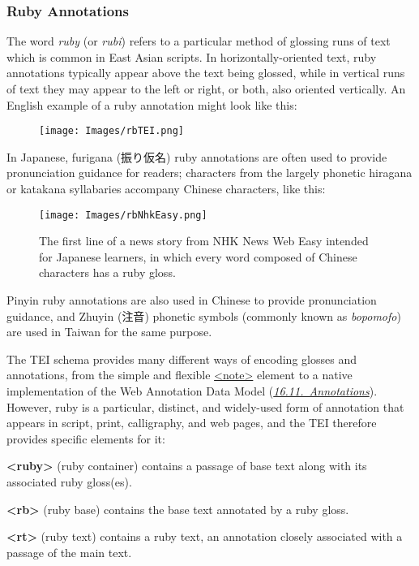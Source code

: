 \subsubsection[{Ruby Annotations}]{Ruby Annotations}\label{COHTGRB}\par
The word \textit{ruby} (or \textit{rubi}) refers to a particular method of glossing runs of text which is common in East Asian scripts. In horizontally-oriented text, ruby annotations typically appear above the text being glossed, while in vertical runs of text they may appear to the left or right, or both, also oriented vertically. An English example of a ruby annotation might look like this:\begin{figure}[htbp]
\noindent\noindent\texttt{[image: Images/rbTEI.png]}\end{figure}
\par
In Japanese, furigana ({\textJapanese 振り仮名}) ruby annotations are often used to provide pronunciation guidance for readers; characters from the largely phonetic hiragana or katakana syllabaries accompany Chinese characters, like this:\begin{figure}[htbp]
\noindent\noindent\texttt{[image: Images/rbNhkEasy.png]}
\caption{The first line of a news story from NHK News Web Easy intended for Japanese learners, in which every word composed of Chinese characters has a ruby gloss.}\end{figure}
\par
Pinyin ruby annotations are also used in Chinese to provide pronunciation guidance, and Zhuyin ({\textChinese 注音}) phonetic symbols (commonly known as \textit{bopomofo}) are used in Taiwan for the same purpose.\par
The TEI schema provides many different ways of encoding glosses and annotations, from the simple and flexible \hyperref[TEI.note]{<note>} element to a native implementation of the Web Annotation Data Model (\textit{\hyperref[SASOann]{16.11.\ Annotations}}). However, ruby is a particular, distinct, and widely-used form of annotation that appears in script, print, calligraphy, and web pages, and the TEI therefore provides specific elements for it: 
\begin{sansreflist}
  
\item [\textbf{<ruby>}] (ruby container) contains a passage of base text along with its associated ruby gloss(es).
\item [\textbf{<rb>}] (ruby base) contains the base text annotated by a ruby gloss.
\item [\textbf{<rt>}] (ruby text) contains a ruby text, an annotation closely associated with a passage of the main text.
\end{sansreflist}
